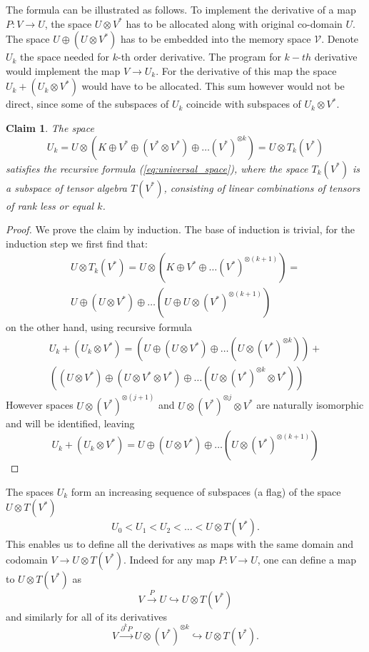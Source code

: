 \documentclass{article}
\newcommand{\VV}{\mathcal{V}}
\newcommand{\D}{\partial}
\newtheorem{trditev}{Claim}[section]
\begin{document}
The formula can be illustrated as follows. 
To implement the derivative of a map $P:V\to U$, the space $U\otimes V^*$ has to
be allocated along with original co-domain $U$.  The space $U\oplus
(U\otimes V^*)$ has to be embedded into the memory space $\VV$.
Denote $U_k$ the space needed for $k$-th order derivative. The program for
$k-th$ derivative would implement the map $V\to U_k$. For the derivative of this map
the space $U_k+ (U_k\otimes V^*)$ would have to be allocated. This sum
however would not be direct, since some of the subspaces of $U_k$ coincide with
subspaces of $U_k\otimes V^*$.
\begin{trditev}
  The space
  \begin{equation}
    \label{eq:k-th-virtual-space}
    U_k = U\otimes \left(K\oplus V^* \oplus (V^*\otimes V^*)\oplus\ldots
      (V^*)^{\otimes k}\right) = U\otimes T_k(V^*)
  \end{equation}
  satisfies the recursive formula (\ref{eq:universal_space}), where the space
  $T_k(V^*)$ is a subspace of \emph{tensor algebra} $T(V^*)$, consisting of linear
  combinations of tensors of rank less or equal $k$.
\end{trditev}

\begin{proof}
  We prove the claim by induction. The base of induction is trivial, for the
  induction step we first find that:
  \begin{multline*}
    U\otimes T_k(V^*)=U\otimes(K\oplus V^*\oplus\ldots (V^*)^{\otimes (k+1)})=\\
    U\oplus (U\otimes V^*)\oplus\ldots (U\oplus U\otimes(V^*)^{\otimes (k+1)})
  \end{multline*}
  on the other hand, using recursive formula
  \begin{multline}
    U_k+(U_k\otimes V^*) = \left( U\oplus (U\otimes V^*)\oplus\ldots (U\otimes(V^*)^{\otimes k})\right) + \\
    \left((U\otimes V^*) \oplus (U\otimes V^*\otimes V^*) \oplus\ldots
      (U\otimes(V^*)^{\otimes k}\otimes V^*)\right)
  \end{multline}
  However spaces $U\otimes(V^*)^{\otimes (j+1)}$ and $U\otimes (V^*)^{\otimes
    j}\otimes V^*$ are naturally isomorphic and will be identified, leaving
  \begin{equation}
    U_k+(U_k\otimes V^*) = U\oplus (U\otimes V^*)\oplus\ldots (U\otimes(V^*)^{\otimes (k+1)})
  \end{equation}
\end{proof}
The spaces $U_k$ form an increasing sequence of subspaces (a flag) of the space $U\otimes
T(V^*)$
\begin{equation}
  \label{eq:flag}
  U_0<U_1<U_2<\ldots < U\otimes T(V^*).
\end{equation}
This enables us to define all the derivatives as maps with
the same domain and codomain $V\to U\otimes T(V^*)$. Indeed for any map $P:V\to
U$, one can define a map to $U\otimes T(V^*)$ as
$$V\xrightarrow{P}U\hookrightarrow U\otimes T(V^*)$$ and similarly  for all of its
derivatives
$$V\xrightarrow{\D^k P} U\otimes (V^*)^{\otimes k}\hookrightarrow U\otimes
T(V^*).$$
\end{document}
